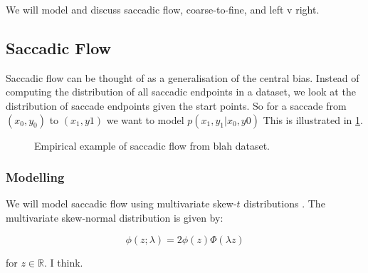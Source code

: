 \documentclass[a4paper, onecolumn, oneside, 11pt]{article}
\begin{document}
We will model and discuss saccadic flow, coarse-to-fine, and left v right. 

\subsection{Saccadic Flow}

Saccadic flow can be thought of as a generalisation of the central bias. Instead of computing the distribution of all saccadic endpoints in a dataset, we look at the distribution of saccade endpoints given the start points. So for a saccade from $(x_0, y_0)$ to $(x_1, y1)$ we want to model $p(x_1,y_1|x_0, y0)$ This is illustrated in \ref{fig:exampleSaccadic Flow}.



\begin{figure}
[insert example image here]
\caption{Empirical example of saccadic flow from blah dataset.}
\label{fig:exampleSaccadic Flow}
\end{figure}

\subsubsection{Modelling}

We will model saccadic flow using multivariate skew-$t$ distributions \citep{azzalini2015}. The multivariate skew-normal distribution \citep{azzalini1996} is given by:

\begin{equation}
\phi(z; \lambda) = 2\phi(z)\Phi(\lambda z) 
\end{equation}

for $z \in \mathbb{R}$. I think. 
\end{document}
